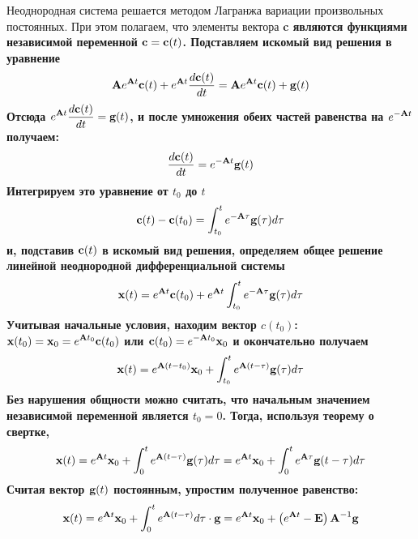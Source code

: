 Неоднородная система решается методом Лагранжа вариации произвольных постоянных. При этом полагаем, что элементы вектора
\bf{c} являются функциями независимой переменной $\bf{c} = \bf{c}(t)$. Подставляем искомый вид решения в уравнение
\begin{equation*}
    \bf{A}e^{\bf{A}t}\bf{c}(t) + e^{\bf{A}t}\frac{d\bf{c}(t)}{dt} = \bf{A} e^{\bf{A}t}\bf{c}(t) + \bf{g}(t)
\end{equation*}
Отсюда $\displaystyle e^{\bf{A}t}\frac{d\bf{c}(t)}{dt} = \bf{g}(t)$, и после умножения обеих частей равенства на
$\displaystyle e^{-\bf{A}t}$ получаем:
\begin{equation*}
    \frac{d\bf{c}(t)}{dt} = e^{-\bf{A}t}\bf{g}(t)
\end{equation*}
Интегрируем это уравнение от $t_0$ до $t$
\begin{equation*}
    \bf{c}(t) - \bf{c}(t_0) = \int_{t_0}^{t} e^{-\bf{A}\tau}\bf{g}(\tau)d\tau
\end{equation*}
и, подставив $\bf{c}(t)$ в искомый вид решения, определяем общее решение линейной неоднородной дифференциальной системы
\begin{equation*}
    \bf{x}(t) = e^{\bf{A}t}\bf{c}(t_0) + e^{\bf{A}t}\int_{t_0}^{t}e^{-\bf{A}\tau}\bf{g}(\tau)d\tau
\end{equation*}
Учитывая начальные условия, находим вектор $\displaystyle c(t_0)$: $\displaystyle \bf{x}(t_0) = \bf{x}_0 = e^{\bf{A}t_0}\bf{c}(t_0)$
или $\displaystyle \bf{c}(t_0) = e^{-\bf{A}t_0}\bf{x}_0$ и окончательно получаем
\begin{equation*}
    \bf{x}(t) = e^{\bf{A}(t - t_0)}\bf{x}_0 + \int_{t_0}^{t} e^{\bf{A}(t - \tau)}\bf{g}(\tau)d\tau
\end{equation*}
Без нарушения общности можно считать, что начальным значением независимой переменной является $\displaystyle t_0 = 0$.
Тогда, используя теорему о свертке,
\begin{equation}
    \bf{x}(t) = e^{\bf{A}t}\bf{x}_0 + \int_{0}^{t} e^{\bf{A}(t - \tau)}\bf{g}(\tau)d\tau = e^{\bf{A}t}\bf{x}_0 + \int_{0}^{t} e^{\bf{A}\tau}\bf{g}(t - \tau)d\tau \label{eq:1}
\end{equation}
Считая вектор $\bf{g}(t)$ постоянным, упростим полученное равенство:
\begin{equation*}
    \bf{x}(t) = e^{\bf{A}t}\bf{x}_0 + \int_{0}^{t} e^{\bf{A}(t - \tau)}d\tau \cdot \bf{g} = e^{\bf{A}t}\bf{x}_0 + \left( e^{\bf{A}t} - \bf{E} \right)\bf{A}^{-1}\bf{g}
\end{equation*}

